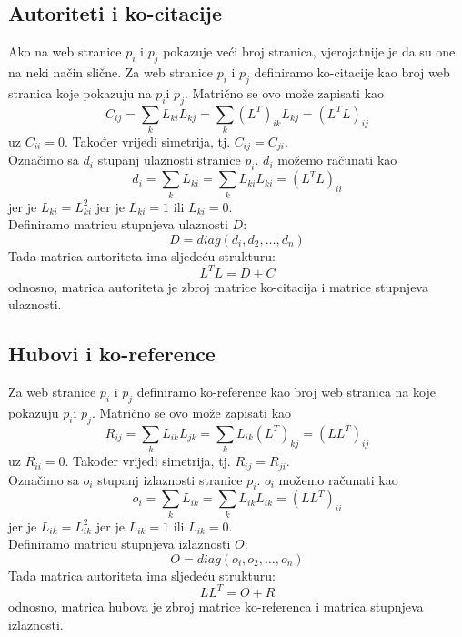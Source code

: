 \documentclass[11pt]{article}
\begin{document}
\subsection{Autoriteti i ko-citacije}
Ako na web stranice $p_i$ i $p_j$ pokazuje veći broj stranica, vjerojatnije je da su one na neki način slične.
Za web stranice $p_i$ i $p_j$ definiramo ko-citacije kao broj web stranica koje pokazuju na $p_i$i $p_j$. Matrično se ovo može zapisati kao
\begin{equation}
C_{ij} = \sum_{k} L_{ki}L_{kj} = \sum_{k}(L^{T})_{ik}L_{kj} = (L^{T}L)_{ij}
\end{equation}
uz $C_{ii} = 0$. Također vrijedi simetrija, tj. $C_{ij} = C_{ji}$.\\
Označimo sa $d_{i}$ stupanj ulaznosti stranice $p_{i}$. $d_{i}$ možemo računati kao
\begin{equation}
d_{i} = \sum_{k}L_{ki} = \sum_{k}L_{ki}L_{ki} = (L^{T}L)_{ii}
\end{equation}
jer je $L_{ki} = L_{ki}^2$ jer je $L_{ki} =1$ ili  $L_{ki} = 0$.\\
Definiramo matricu stupnjeva ulaznosti $D$:
\begin{equation}
D = diag(d_{i},d_{2}, \dots , d_{n})
\end{equation}
Tada matrica autoriteta ima sljedeću strukturu:
\begin{equation}
L^{T}L = D + C
\end{equation}
odnosno, matrica autoriteta je zbroj matrice ko-citacija i matrice stupnjeva ulaznosti.
\subsection{Hubovi i ko-reference}
Za web stranice $p_i$ i $p_j$ definiramo ko-reference kao broj web stranica na koje pokazuju $p_i$i $p_j$. Matrično se ovo može zapisati kao
\begin{equation}
R_{ij} = \sum_{k} L_{ik}L_{jk} = \sum_{k}L_{ik}(L^{T})_{kj} = (LL^{T})_{ij}
\end{equation}
uz $R_{ii} = 0$. Također vrijedi simetrija, tj. $R_{ij} = R_{ji}$.\\
Označimo sa $o_{i}$ stupanj izlaznosti stranice $p_{i}$. $o_{i}$ možemo računati kao
\begin{equation}
o_{i} = \sum_{k}L_{ik} = \sum_{k}L_{ik}L_{ik} = (LL^{T})_{ii}
\end{equation}
jer je $L_{ik} = L_{ik}^2$ jer je $L_{ik} =1$ ili  $L_{ik} = 0$.\\
Definiramo matricu stupnjeva izlaznosti $O$:
\begin{equation}
O = diag(o_{i},o_{2}, \dots , o_{n})
\end{equation}
Tada matrica autoriteta ima sljedeću strukturu:
\begin{equation}
LL^{T} = O + R
\end{equation}
odnosno, matrica hubova je zbroj matrice ko-referenca i matrica stupnjeva izlaznosti.
\end{document}
